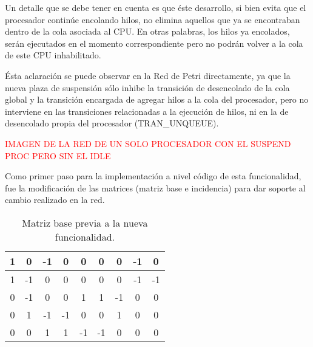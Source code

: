 Un detalle que se debe tener en cuenta es que éste desarrollo, si bien evita que el procesador continúe encolando hilos, no elimina aquellos que ya se encontraban dentro de la cola asociada al CPU. En otras palabras, los hilos ya encolados, serán ejecutados en el momento correspondiente pero no podrán volver a la cola de este CPU inhabilitado.\par

Ésta aclaración se puede observar en la Red de Petri directamente, ya que la nueva plaza de suspensión sólo inhibe la transición de desencolado de la cola global y la transición encargada de agregar hilos a la cola del procesador, pero no interviene en las transiciones relacionadas a la ejecución de hilos, ni en la de desencolado propia del procesador (TRAN\_UNQUEUE).\par

\textcolor{red}{IMAGEN DE LA RED DE UN SOLO PROCESADOR CON EL SUSPEND PROC PERO SIN EL IDLE}

Como primer paso para la implementación a nivel código de esta funcionalidad, fue la modificación de las matrices (matriz base e incidencia) para dar soporte al cambio realizado en la red.\par

\renewcommand{\arraystretch}{1.5}
\setlength{\tabcolsep}{10pt}

\begin{table}[H]
    \centering
    \begin{tabular}{|c|c|c|c|c|c|c|c|c|}
        \hline
        1 & 0 & -1 & 0 & 0 & 0 & 0 & -1 & 0 \\
        \hline
        1 & -1 & 0 & 0 & 0 & 0 & 0 & -1 & -1 \\
        \hline
        0 & -1 & 0 & 0 & 1 & 1 & -1 & 0 & 0 \\
        \hline
        0 & 1 & -1 & -1 & 0 & 0 & 1 & 0 & 0 \\
        \hline
        0 & 0 & 1 & 1 & -1 & -1 & 0 & 0 & 0 \\
        \hline
    \end{tabular}
    \caption{Matriz base previa a la nueva funcionalidad.}
    \label{tabla:matriz_base_pre}
\end{table}

